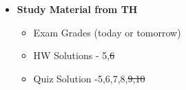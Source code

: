 \documentclass[11pt]{article}
\newcommand{\B}{\color{blue}}
\newcommand{\K}{\color{black}}
\newcommand{\G}{\color{mygreen}}
\newcommand{\PR}{\color{mypurple}}
\begin{document}
\begin{itemize}
\begin{enumerate}
\begin{itemize}
		\end{itemize}
	\end{enumerate}
%
\item  \textbf{\Large Study Material from TH}\\
\begin{itemize}

\item Exam Grades (today or tomorrow)

\item HW Solutions - 5,\st{6}

\item Quiz Solution -5,6,7,8,\st{9,10}\\
%


\end{itemize}




\newpage


%
%

\end{itemize}
\end{document}

